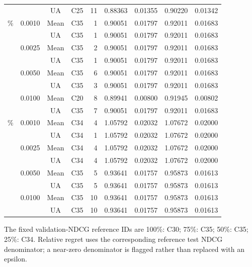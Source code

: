 \begin{table}[H]
{\begin{tabular}{@{}llccrrrrr@{}}
 &  & UA & C25 & 11 & 0.88363 & 0.01355 & 0.90220 & 0.01342 \\
\addlinespace
50\% & 0.0010 & Mean & C35 & 1 & 0.90051 & 0.01797 & 0.92011 & 0.01683 \\
 &  & UA & C35 & 1 & 0.90051 & 0.01797 & 0.92011 & 0.01683 \\
 & 0.0025 & Mean & C35 & 2 & 0.90051 & 0.01797 & 0.92011 & 0.01683 \\
 &  & UA & C35 & 1 & 0.90051 & 0.01797 & 0.92011 & 0.01683 \\
 & 0.0050 & Mean & C35 & 6 & 0.90051 & 0.01797 & 0.92011 & 0.01683 \\
 &  & UA & C35 & 3 & 0.90051 & 0.01797 & 0.92011 & 0.01683 \\
 & 0.0100 & Mean & C20 & 8 & 0.89941 & 0.00800 & 0.91945 & 0.00802 \\
 &  & UA & C35 & 7 & 0.90051 & 0.01797 & 0.92011 & 0.01683 \\
\addlinespace
25\% & 0.0010 & Mean & C34 & 4 & 1.05792 & 0.02032 & 1.07672 & 0.02000 \\
 &  & UA & C34 & 1 & 1.05792 & 0.02032 & 1.07672 & 0.02000 \\
 & 0.0025 & Mean & C34 & 4 & 1.05792 & 0.02032 & 1.07672 & 0.02000 \\
 &  & UA & C34 & 4 & 1.05792 & 0.02032 & 1.07672 & 0.02000 \\
 & 0.0050 & Mean & C35 & 5 & 0.93641 & 0.01757 & 0.95873 & 0.01613 \\
 &  & UA & C35 & 5 & 0.93641 & 0.01757 & 0.95873 & 0.01613 \\
 & 0.0100 & Mean & C35 & 10 & 0.93641 & 0.01757 & 0.95873 & 0.01613 \\
 &  & UA & C35 & 10 & 0.93641 & 0.01757 & 0.95873 & 0.01613 \\
\bottomrule
\end{tabular}%
}
\par\smallskip\footnotesize The fixed validation-NDCG reference IDs are 100\%: C30; 75\%: C35; 50\%: C35; 25\%: C34. Relative regret uses the corresponding reference test NDCG denominator; a near-zero denominator is flagged rather than replaced with an epsilon.
\end{table}
